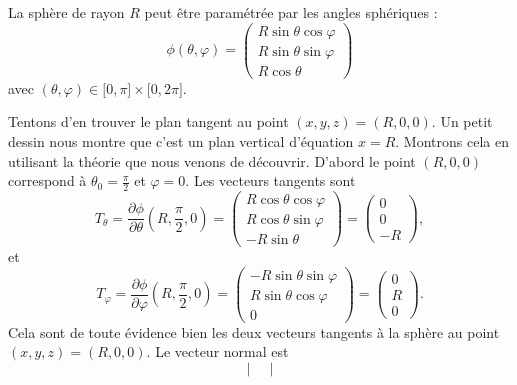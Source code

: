 \begin{example}
	La sphère de rayon \( R\) peut être paramétrée par les angles sphériques :
	\begin{equation}
		\phi(\theta,\varphi)=\begin{pmatrix}
			R\sin\theta\cos\varphi \\
			R\sin\theta\sin\varphi \\
			R\cos\theta
		\end{pmatrix}
	\end{equation}
	avec \( (\theta,\varphi)\in\mathopen[ 0 , \pi \mathclose]\times \mathopen[ 0 , 2\pi \mathclose]\).

	Tentons d'en trouver le plan tangent au point \( (x,y,z)=(R,0,0)\). Un petit dessin nous montre que c'est un plan vertical d'équation \( x=R\). Montrons cela en utilisant la théorie que nous venons de découvrir. D'abord le point \( (R,0,0)\) correspond à \( \theta_0=\frac{ \pi }{ 2 }\) et \( \varphi=0\). Les vecteurs tangents sont
	\begin{equation}        \label{EqTthetaSph}
		T_{\theta}=\frac{ \partial \phi }{ \partial \theta }(R,\frac{ \pi }{2},0)=\begin{pmatrix}
			R\cos\theta\cos\varphi \\
			R\cos\theta\sin\varphi \\
			-R\sin\theta
		\end{pmatrix}=\begin{pmatrix}
			0 \\
			0 \\
			-R
		\end{pmatrix},
	\end{equation}
	et
	\begin{equation}    \label{EqTvarphiSph}
		T_{\varphi}=\frac{ \partial \phi }{ \partial \varphi }(R,\frac{ \pi }{2},0)=\begin{pmatrix}
			-R\sin\theta\sin\varphi \\
			R\sin\theta\cos\varphi  \\
			0
		\end{pmatrix}=\begin{pmatrix}
			0 \\
			R \\
			0
		\end{pmatrix}.
	\end{equation}
	Cela sont de toute évidence bien les deux vecteurs tangents à la sphère au point \( (x,y,z)=(R,0,0)\). Le vecteur normal est
	\begin{equation}
		\begin{vmatrix}

\end{vmatrix}
\end{equation}
\end{example}

